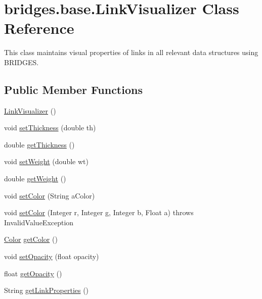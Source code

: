 \hypertarget{classbridges_1_1base_1_1_link_visualizer}{}\section{bridges.\+base.\+Link\+Visualizer Class Reference}
\label{classbridges_1_1base_1_1_link_visualizer}


This class maintains visual properties of links in all relevant data structures using B\+R\+I\+D\+G\+ES.  


\subsection*{Public Member Functions}
\begin{DoxyCompactItemize}
\item 
\hyperlink{classbridges_1_1base_1_1_link_visualizer_a0b69f099fa264ae9097b0efe278c6a1b}{Link\+Visualizer} ()
\item 
void \hyperlink{classbridges_1_1base_1_1_link_visualizer_a702e9ca345d1a4a035baf2041f275849}{set\+Thickness} (double th)
\item 
double \hyperlink{classbridges_1_1base_1_1_link_visualizer_af1592d2a8664b00c1a51fdc0f8d1860a}{get\+Thickness} ()
\item 
void \hyperlink{classbridges_1_1base_1_1_link_visualizer_a21d5884d243cf5a08f9d544f5083a44c}{set\+Weight} (double wt)
\item 
double \hyperlink{classbridges_1_1base_1_1_link_visualizer_ac96d7fb118ae6c7e1bdd57c5e2c8639a}{get\+Weight} ()
\item 
void \hyperlink{classbridges_1_1base_1_1_link_visualizer_a8c77064e7f40caaf8c3ecda830273a7d}{set\+Color} (String a\+Color)
\item 
void \hyperlink{classbridges_1_1base_1_1_link_visualizer_a003905cfe33e1704555b2b3a1cf99bad}{set\+Color} (Integer r, Integer g, Integer b, Float a)  throws Invalid\+Value\+Exception 
\item 
\hyperlink{classbridges_1_1base_1_1_color}{Color} \hyperlink{classbridges_1_1base_1_1_link_visualizer_a3ed52d98ecab99c6d8dd136fba913b7d}{get\+Color} ()
\item 
void \hyperlink{classbridges_1_1base_1_1_link_visualizer_ac0d59614dbc65ed0a19c25c493a1deaa}{set\+Opacity} (float opacity)
\item 
float \hyperlink{classbridges_1_1base_1_1_link_visualizer_a07cdd435a54e4b612ad63614f2a27a4a}{get\+Opacity} ()
\item 
String \hyperlink{classbridges_1_1base_1_1_link_visualizer_ab64d9b7e2b99f7ebce80cbabfe4adf2a}{get\+Link\+Properties} ()
\end{DoxyCompactItemize}


